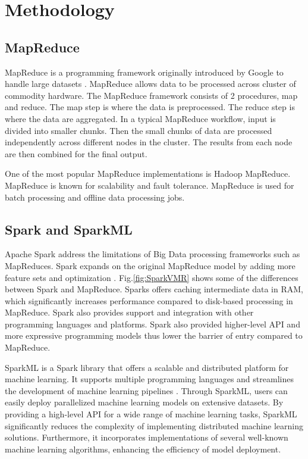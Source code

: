 \documentclass[12pt]{report}
\begin{document}
\section{Methodology}
\subsection{MapReduce}
MapReduce is a programming framework originally introduced by Google to handle large datasets \cite{MapReduce}. MapReduce allows data to be processed across cluster of commodity hardware\cite{karloff2010model}. The MapReduce framework consists of 2 procedures, map and reduce. The map step is where the data is preprocessed. The reduce step is where the data are aggregated. In a typical MapReduce workflow, input is divided into smaller chunks. Then the small chunks of data are processed independently across different nodes in the cluster. The results from each node are then combined for the final output. 

One of the most popular MapReduce implementations is Hadoop MapReduce. MapReduce is known for scalability and fault tolerance. MapReduce is used for batch processing and offline data processing jobs.

\subsection{Spark and SparkML}
Apache Spark address the limitations of  Big Data processing frameworks such as MapReduces. Spark expands on the original MapReduce model by adding more feature sets and optimization \cite{Spark}. Fig.\ref{fig:SparkVMR} shows some of the differences between Spark and MapReduce.
Sparks offers caching intermediate data in RAM, which significantly increases performance compared to disk-based processing in MapReduce. Spark also provides support and integration with other programming languages and platforms. Spark also provided higher-level API and more expressive programming models thus lower the barrier of entry compared to MapReduce.

SparkML is a Spark library that offers a scalable and distributed platform for machine learning. It supports multiple programming languages and streamlines the development of machine learning pipelines \cite{SparkML}. Through SparkML, users can easily deploy parallelized machine learning models on extensive datasets. By providing a high-level API for a wide range of machine learning tasks, SparkML significantly reduces the complexity of implementing distributed machine learning solutions. Furthermore, it incorporates implementations of several well-known machine learning algorithms, enhancing the efficiency of model deployment.
\end{document}
